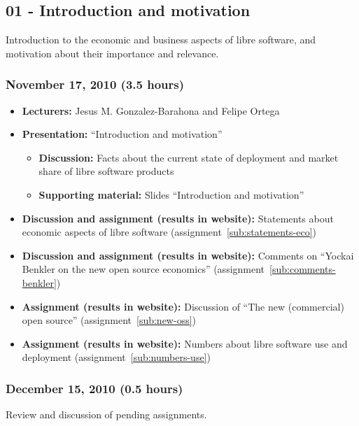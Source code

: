 \documentclass[a4paper]{article}
\begin{document}
\subsection{01 - Introduction and motivation}

Introduction to the economic and business aspects of libre software, and motivation about their importance and relevance.

\subsubsection{November 17, 2010 (3.5 hours)}

\begin{itemize}
\item \textbf{Lecturers:} Jesus M. Gonzalez-Barahona and Felipe Ortega
\item \textbf{Presentation:} ``Introduction and motivation''
  \begin{itemize}
  \item \textbf{Discussion:} Facts about the current state of deployment and market share of libre software products
  \item \textbf{Supporting material:} Slides ``Introduction and motivation''
  \end{itemize}
\item \textbf{Discussion and assignment (results in website):} Statements about economic aspects of libre software (assignment~\ref{sub:statements-eco})
\item \textbf{Discussion and assignment (results in website):} Comments on ``Yockai Benkler on the new open source economics'' (assignment~\ref{sub:comments-benkler})
\item \textbf{Assignment (results in website):} Discussion of ``The new (commercial) open source'' (assignment~\ref{sub:new-oss})
\item \textbf{Assignment (results in website):} Numbers about libre software use and deployment (assignment~\ref{sub:numbers-use})
\end{itemize}

\subsubsection{December 15, 2010 (0.5 hours)}

Review and discussion of pending assignments.
\end{document}
